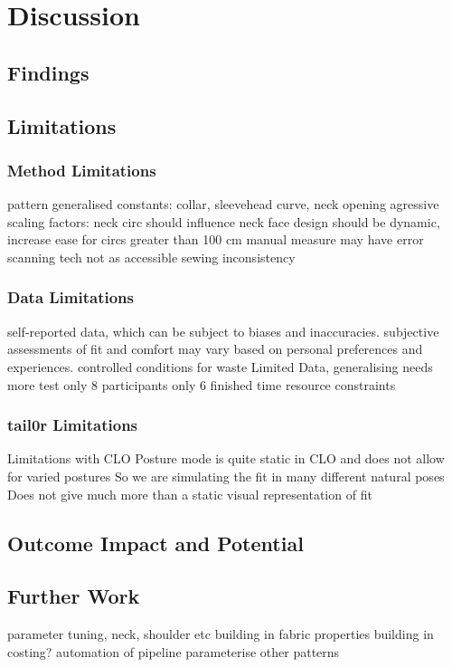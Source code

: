 \chapter{Discussion}

\section{Findings}

\section{Limitations}

\subsection{Method Limitations}
pattern generalised
constants: collar, sleevehead curve, neck opening
agressive scaling factors:
neck circ should influence neck face
design should be dynamic, increase ease for circs greater than 100 cm
manual measure may have error
scanning tech not as accessible
sewing inconsistency

\subsection{Data Limitations}
self-reported data, which can be subject to biases and inaccuracies. subjective assessments of fit and comfort may vary based on personal preferences and experiences. 
controlled conditions for waste
Limited Data, generalising needs more test
only 8 participants only 6 finished
time resource constraints

\subsection{tail0r Limitations}
Limitations with CLO
Posture mode is quite static in CLO and does not allow for varied postures
So we are simulating the fit in many different natural poses
Does not give much more than a static visual representation of fit

\section{Outcome Impact and Potential}

\section{Further Work}
parameter tuning, neck, shoulder etc
building in fabric properties
building in costing?
automation of pipeline
parameterise other patterns